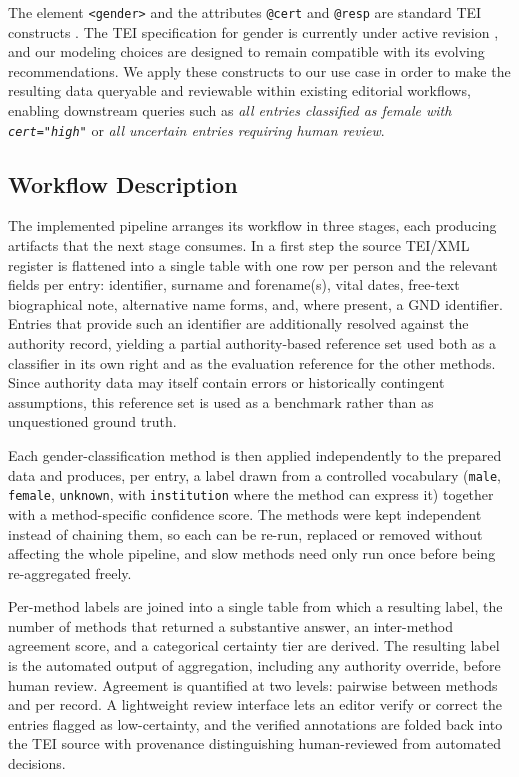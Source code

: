 \documentclass{eceasst}
\begin{document}
The element \texttt{<gender>} and the attributes \texttt{@cert} and \texttt{@resp} are standard TEI constructs \cite{tei_consortium_tei_2026}. The TEI specification for gender is currently under active revision \cite{beshero-bondar_revising_2024}, and our modeling choices are designed to remain compatible with its evolving recommendations. We apply these constructs to our use case in order to make the resulting data queryable and reviewable within existing editorial workflows, enabling downstream queries such as \emph{all entries classified as female with \texttt{cert="high"}} or \emph{all uncertain entries requiring human review}.

\subsection{Workflow Description}

The implemented pipeline arranges its workflow in three stages, each producing artifacts that the next stage consumes. In a first step the source TEI/XML register is flattened into a single table with one row per person and the relevant fields per entry: identifier, surname and forename(s), vital dates, free-text biographical note, alternative name forms, and, where present, a GND identifier. Entries that provide such an identifier are additionally resolved against the authority record, yielding a partial authority-based reference set used both as a classifier in its own right and as the evaluation reference for the other methods. Since authority data may itself contain  errors or historically contingent assumptions, this reference set is used as a benchmark rather than as unquestioned ground truth.

Each gender-classification method is then applied independently to the prepared data and produces, per entry, a label drawn from a controlled vocabulary (\texttt{male}, \texttt{female}, \texttt{unknown}, with \texttt{institution} where the method can express it) together with a method-specific confidence score. The methods were kept independent instead of chaining them, so each can be re-run, replaced or removed without affecting the whole pipeline, and slow methods need only run once before being re-aggregated freely.

Per-method labels are joined into a single table from which a resulting label, the number of methods that returned a substantive answer, an inter-method agreement score, and a categorical certainty tier are derived. The resulting label is the automated output of aggregation, including any authority override, before human review. Agreement is quantified at two levels: pairwise between methods and per record. A lightweight review interface lets an editor verify or correct the entries flagged as low-certainty, and the verified annotations are folded back into the TEI source with provenance distinguishing human-reviewed from automated decisions.
\end{document}
